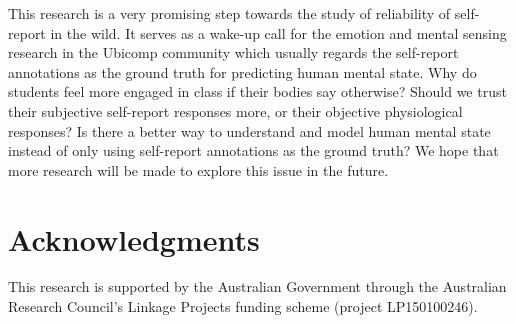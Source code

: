 \documentclass[sigconf]{acmart}
\begin{document}
This research is a very promising step towards the study of reliability of self-report in the wild. It serves as a wake-up call for the emotion and mental sensing research in the Ubicomp community which usually regards the self-report annotations as the ground truth for predicting human mental state. Why do students feel more engaged in class if their bodies say otherwise? Should we trust their subjective self-report responses more, or their objective physiological responses? Is there a better way to understand and model human mental state instead of only using self-report annotations as the ground truth? We hope that more research will be made to explore this issue in the future.



\section{Acknowledgments}

This research is supported by the Australian Government through the Australian Research Council's Linkage Projects funding scheme (project LP150100246).



\end{document}
